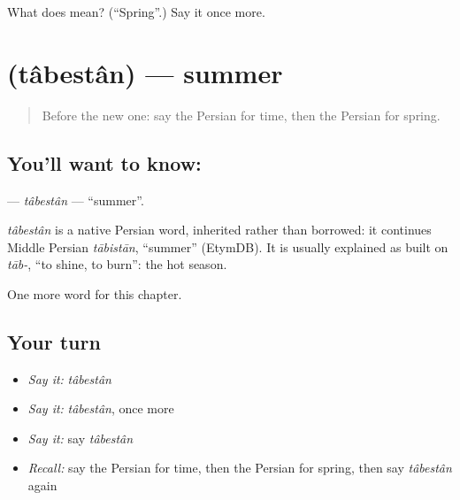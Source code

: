 \begin{tcolorbox}[breakable,colback=teal!4,colframe=teal!35!black,title={Before you move on}]
What does  mean? (\textquotedblleft{}Spring\textquotedblright{}.) Say it once more.
\end{tcolorbox}
\section[\texorpdfstring{\fa{تابستان} (tâbestân)}{تابستان (tâbestân)}]{ (tâbestân) — summer}

\label{lesson:FA-C80-tabestan}



\begin{quote}
Before the new one: say the Persian for time, then the Persian for spring.
\end{quote}

\subsection*{You'll want to know: }
\textbf{} — \emph{tâbestân} — \textquotedblleft{}summer\textquotedblright{}.

\begin{cousinweb}
\emph{tâbestân} is a native Persian word, inherited rather than borrowed: it continues Middle Persian \emph{tābistān}, \textquotedblleft{}summer\textquotedblright{} (EtymDB). It is usually explained as built on \emph{tāb-}, \textquotedblleft{}to shine, to burn\textquotedblright{}: the hot season.
\end{cousinweb}

\begin{grammarlens}[title={What you've built}]
One more word for this chapter.
\end{grammarlens}

\subsection*{Your turn}
\begin{itemize}
\raggedright
  \item \emph{Say it:} \emph{tâbestân}
  \item \emph{Say it:} \emph{tâbestân}, once more
  \item \emph{Say it:} say \emph{tâbestân}
  \item \emph{Recall:} say the Persian for time, then the Persian for spring, then say \emph{tâbestân} again
\end{itemize}

